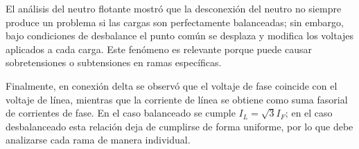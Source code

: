 El análisis del neutro flotante mostró que la desconexión del neutro no siempre produce un problema si las cargas son perfectamente balanceadas; sin embargo, bajo condiciones de desbalance el punto común se desplaza y modifica los voltajes aplicados a cada carga. Este fenómeno es relevante porque puede causar sobretensiones o subtensiones en ramas específicas.

Finalmente, en conexión delta se observó que el voltaje de fase coincide con el voltaje de línea, mientras que la corriente de línea se obtiene como suma fasorial de corrientes de fase. En el caso balanceado se cumple $I_L=\sqrt{3}I_F$; en el caso desbalanceado esta relación deja de cumplirse de forma uniforme, por lo que debe analizarse cada rama de manera individual.
